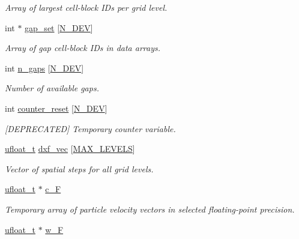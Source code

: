 \begin{DoxyCompactItemize}
\begin{DoxyCompactList}\small\item\em Array of largest cell-\/block I\+Ds per grid level. \end{DoxyCompactList}\item 
int $\ast$ \hyperlink{classMesh_ac93e6c7bad14ea20def3e3464a261322}{gap\+\_\+set} \mbox{[}\hyperlink{cppspec_8h_a2b674dab7a14f1bf32b48b7fda5022dc}{N\+\_\+\+D\+EV}\mbox{]}
\begin{DoxyCompactList}\small\item\em Array of gap cell-\/block I\+Ds in data arrays. \end{DoxyCompactList}\item 
int \hyperlink{classMesh_ab4b00fa4b614ac8ebbaefcf7e08e0680}{n\+\_\+gaps} \mbox{[}\hyperlink{cppspec_8h_a2b674dab7a14f1bf32b48b7fda5022dc}{N\+\_\+\+D\+EV}\mbox{]}
\begin{DoxyCompactList}\small\item\em Number of available gaps. \end{DoxyCompactList}\item 
int \hyperlink{classMesh_a41a24fd7347d4d39f64ce54c65c7dcd5}{counter\+\_\+reset} \mbox{[}\hyperlink{cppspec_8h_a2b674dab7a14f1bf32b48b7fda5022dc}{N\+\_\+\+D\+EV}\mbox{]}
\begin{DoxyCompactList}\small\item\em \mbox{[}D\+E\+P\+R\+E\+C\+A\+T\+ED\mbox{]} Temporary counter variable. \end{DoxyCompactList}\item 
\hyperlink{cppspec_8h_af529d360dfac9b9578aa719418a53a21}{ufloat\+\_\+t} \hyperlink{classMesh_a60333b1a7a0edd36b7826f70829b7627}{dxf\+\_\+vec} \mbox{[}\hyperlink{cppspec_8h_add784659439a8dd6b1423406171414d3}{M\+A\+X\+\_\+\+L\+E\+V\+E\+LS}\mbox{]}
\begin{DoxyCompactList}\small\item\em Vector of spatial steps for all grid levels. \end{DoxyCompactList}\item 
\hyperlink{cppspec_8h_af529d360dfac9b9578aa719418a53a21}{ufloat\+\_\+t} $\ast$ \hyperlink{classMesh_ad166f6f55e4a13f49d2ba33598157756}{c\+\_\+F}
\begin{DoxyCompactList}\small\item\em Temporary array of particle velocity vectors in selected floating-\/point precision. \end{DoxyCompactList}\item 
\hyperlink{cppspec_8h_af529d360dfac9b9578aa719418a53a21}{ufloat\+\_\+t} $\ast$ \hyperlink{classMesh_a02cfbbadd6a7c556018e7c4503d18128}{w\+\_\+F}

\end{DoxyCompactItemize}
